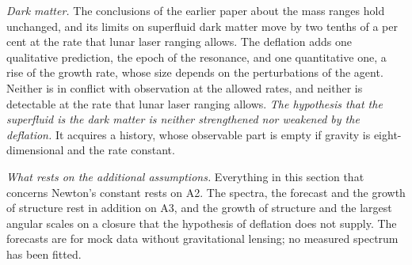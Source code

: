 \emph{Dark matter.} The conclusions of the earlier paper about the mass ranges hold unchanged, and
its limits on superfluid dark matter move by two tenths of a per cent at the rate that lunar laser
ranging allows. The deflation adds one qualitative prediction, the epoch of the resonance, and one
quantitative one, a rise of the growth rate, whose size depends on the perturbations of the agent.
Neither is in conflict with observation at the allowed rates, and neither is detectable at the rate
that lunar laser ranging allows. \emph{The hypothesis that the superfluid is the dark matter is
neither strengthened nor weakened by the deflation.} It acquires a history, whose observable part is
empty if gravity is eight-dimensional and the rate constant.

\emph{What rests on the additional assumptions.} Everything in this section that concerns Newton's
constant rests on A2. The spectra, the forecast and the growth of structure rest in addition on A3,
and the growth of structure and the largest angular scales on a closure that the hypothesis of
deflation does not supply. The forecasts are for mock data without gravitational lensing; no
measured spectrum has been fitted.
